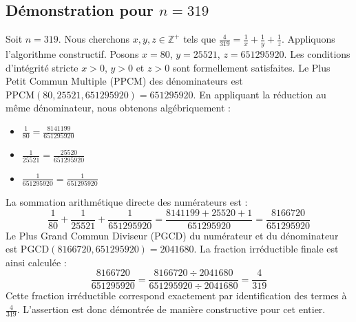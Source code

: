 \documentclass[11pt,a4paper]{article}
\begin{document}
\subsection{Démonstration pour $n = 319$}
Soit $n = 319$. Nous cherchons $x, y, z \in \mathbb{Z}^{+}$ tels que $\frac{4}{319} = \frac{1}{x} + \frac{1}{y} + \frac{1}{z}$.
Appliquons l'algorithme constructif. Posons $x = 80$, $y = 25521$, $z = 651295920$.
Les conditions d'intégrité stricte $x > 0$, $y > 0$ et $z > 0$ sont formellement satisfaites.
Le Plus Petit Commun Multiple (PPCM) des dénominateurs est $\text{PPCM}(80, 25521, 651295920) = 651295920$.
En appliquant la réduction au même dénominateur, nous obtenons algébriquement :
\begin{itemize}
    \item $\frac{1}{80} = \frac{8141199}{651295920}$
    \item $\frac{1}{25521} = \frac{25520}{651295920}$
    \item $\frac{1}{651295920} = \frac{1}{651295920}$
\end{itemize}
La sommation arithmétique directe des numérateurs est :
$$ \frac{1}{80} + \frac{1}{25521} + \frac{1}{651295920} = \frac{8141199 + 25520 + 1}{651295920} = \frac{8166720}{651295920} $$
Le Plus Grand Commun Diviseur (PGCD) du numérateur et du dénominateur est $\text{PGCD}(8166720, 651295920) = 2041680$.
La fraction irréductible finale est ainsi calculée :
$$ \frac{8166720}{651295920} = \frac{8166720 \div 2041680}{651295920 \div 2041680} = \frac{4}{319} $$
Cette fraction irréductible correspond exactement par identification des termes à $\frac{4}{319}$. L'assertion est donc démontrée de manière constructive pour cet entier.
\end{document}
